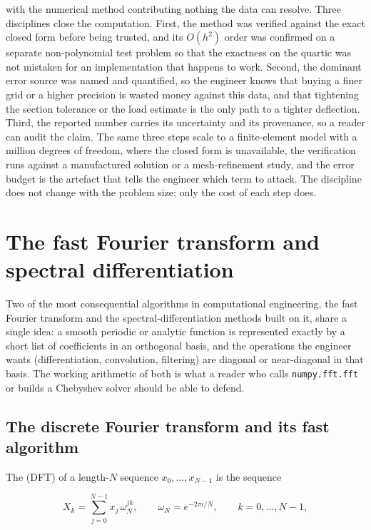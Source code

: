 with the numerical method contributing nothing the data can resolve. Three
disciplines close the computation. First, the method was verified against
the exact closed form before being trusted, and its $O(h^{2})$ order was
confirmed on a separate non-polynomial test problem so that the exactness
on the quartic was not mistaken for an implementation that happens to work.
Second, the dominant error source was named and quantified, so the
engineer knows that buying a finer grid or a higher precision is wasted
money against this data, and that tightening the section tolerance or the
load estimate is the only path to a tighter deflection. Third, the reported
number carries its uncertainty and its provenance, so a reader can audit
the claim. The same three steps scale to a finite-element model with a
million degrees of freedom, where the closed form is unavailable, the
verification runs against a manufactured solution or a mesh-refinement
study, and the error budget is the artefact that tells the engineer which
term to attack. The discipline does not change with the problem size; only
the cost of each step does.

\section{The fast Fourier transform and spectral differentiation}

Two of the most consequential algorithms in computational engineering, the
fast Fourier transform and the spectral-differentiation methods built on it,
share a single idea: a smooth periodic or analytic function is represented
exactly by a short list of coefficients in an orthogonal basis, and the
operations the engineer wants (differentiation, convolution, filtering) are
diagonal or near-diagonal in that basis. The working arithmetic of both is what a reader who calls
\texttt{numpy.fft.fft} or builds a Chebyshev solver should be able to
defend.

\subsection{The discrete Fourier transform and its fast algorithm}

The  (DFT) of a length-$N$ sequence
$x_{0}, \ldots, x_{N-1}$ is the sequence

\[
X_{k} = \sum_{j=0}^{N-1} x_{j}\, \omega_{N}^{jk},
\qquad \omega_{N} = e^{-2\pi i/N},
\qquad k = 0, \ldots, N-1,
\]

